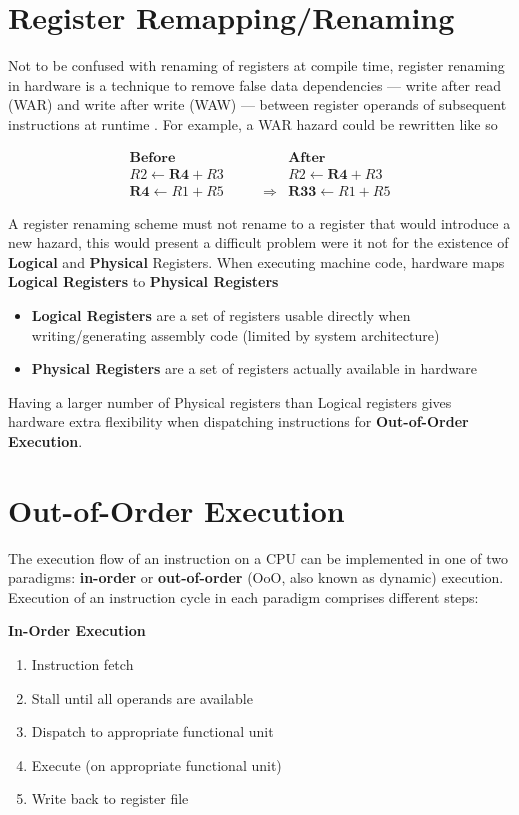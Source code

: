 \documentclass[12pt]{report}
\begin{document}
\section{Register Remapping/Renaming}
\label{sec:orgdd91334}
Not to be confused with renaming of registers at compile time, register
renaming in hardware is a technique to remove false data dependencies ---
write after read (WAR) and write after write (WAW) --- between register
operands of subsequent instructions at runtime \parencite{sima2000design}.
For example, a WAR hazard could be rewritten like so

\begin{align*}
\textbf{Before}                   & \qquad &                 \textbf{After} \\
R2 \leftarrow \textbf{R4} + R3    & \qquad &                 R2 \leftarrow \textbf{R4} + R3 \\
\textbf{R4} \leftarrow R1 + R5    & \qquad \Longrightarrow & \textbf{R33} \leftarrow R1 + R5
\end{align*}

A register renaming scheme must not rename to a register that would introduce
a new hazard, this would present a difficult problem were it not for the
existence of \textbf{Logical} and \textbf{Physical} Registers. When executing machine code,
hardware maps \textbf{Logical Registers} to \textbf{Physical Registers}
\begin{itemize}
\item \textbf{Logical Registers} are a set of registers usable directly when
writing/generating assembly code (limited by system architecture)
\item \textbf{Physical Registers} are a set of registers actually available in hardware
\end{itemize}
Having a larger number of Physical registers than Logical registers gives
hardware extra flexibility when dispatching instructions for \textbf{Out-of-Order Execution}.

\section{Out-of-Order Execution}
\label{sec:orge05b0b5}

The execution flow of an instruction on a CPU can be implemented in one of
two paradigms: \textbf{in-order} or \textbf{out-of-order} (OoO, also known as dynamic)
execution. Execution of an instruction cycle in each paradigm comprises
different steps:

\noindent
\textbf{In-Order Execution}
\begin{enumerate}
\item Instruction fetch
\item Stall until all operands are available
\item Dispatch to appropriate functional unit
\item Execute (on appropriate functional unit)
\item Write back to register file
\end{enumerate}
\end{document}
